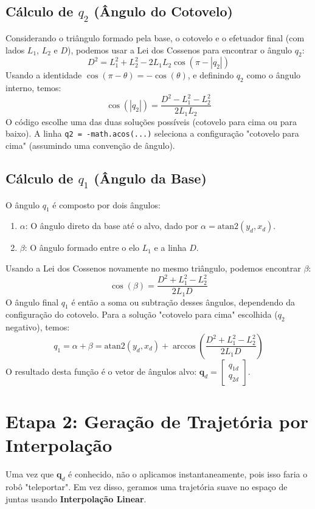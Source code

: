 \documentclass[a4paper, 12pt]{article}
\begin{document}
\subsection{Cálculo de $q_2$ (Ângulo do Cotovelo)}
Considerando o triângulo formado pela base, o cotovelo e o efetuador final (com lados $L_1$, $L_2$ e $D$), podemos usar a Lei dos Cossenos para encontrar o ângulo $q_2$:
\[
D^2 = L_1^2 + L_2^2 - 2 L_1 L_2 \cos(\pi - |q_2|)
\]
Usando a identidade $\cos(\pi - \theta) = -\cos(\theta)$, e definindo $q_2$ como o ângulo interno, temos:
\[
\cos(|q_2|) = \frac{D^2 - L_1^2 - L_2^2}{2 L_1 L_2}
\]
O código escolhe uma das duas soluções possíveis (cotovelo para cima ou para baixo). A linha \texttt{q2 = -math.acos(...)} seleciona a configuração "cotovelo para cima" (assumindo uma convenção de ângulo).

\subsection{Cálculo de $q_1$ (Ângulo da Base)}
O ângulo $q_1$ é composto por dois ângulos:
\begin{enumerate}
    \item $\alpha$: O ângulo direto da base até o alvo, dado por $\alpha = \text{atan2}(y_d, x_d)$.
    \item $\beta$: O ângulo formado entre o elo $L_1$ e a linha $D$.
\end{enumerate}
Usando a Lei dos Cossenos novamente no mesmo triângulo, podemos encontrar $\beta$:
\[
\cos(\beta) = \frac{D^2 + L_1^2 - L_2^2}{2 L_1 D}
\]
O ângulo final $q_1$ é então a soma ou subtração desses ângulos, dependendo da configuração do cotovelo. Para a solução "cotovelo para cima" escolhida ($q_2$ negativo), temos:
\[
q_1 = \alpha + \beta = \text{atan2}(y_d, x_d) + \arccos\left(\frac{D^2 + L_1^2 - L_2^2}{2 L_1 D}\right)
\]
O resultado desta função é o vetor de ângulos alvo: $\mathbf{q}_d = \begin{bmatrix} q_{1d} \\ q_{2d} \end{bmatrix}$.

\section{Etapa 2: Geração de Trajetória por Interpolação}
Uma vez que $\mathbf{q}_d$ é conhecido, não o aplicamos instantaneamente, pois isso faria o robô "teleportar". Em vez disso, geramos uma trajetória suave no espaço de juntas usando \textbf{Interpolação Linear}.
\end{document}
